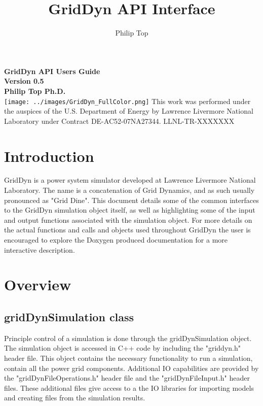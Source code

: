 \documentclass[12pt]{article} %
\title{GridDyn API Interface}
\author{Philip Top}
\date{} %
\date{\displaydate{date}}
\begin{document}
\begin{titlepage}
        \centering
        \vfill
        {\bfseries\Large
            GridDyn API Users Guide\\
            Version 0.5\\
            \vskip2cm
            Philip Top Ph.D.\\
        }
        \vfill
        \texttt{[image: ../images/GridDyn\_FullColor.png]}
        \vfill
        This work was performed under the auspices of the U.S. Department of Energy by
        Lawrence Livermore National Laboratory under Contract DE-AC52-07NA27344.
        LLNL-TR-XXXXXXX
        \vfill
\end{titlepage}

\newpage
\tableofcontents
\section{Introduction}

GridDyn is a power system simulator developed at Lawrence Livermore National Laboratory. The name is a concatenation of Grid Dynamics, and as such usually pronounced as "Grid Dine".   This document details some of the common interfaces to the GridDyn simulation object itself, as well as highlighting some of the input and output functions associated with the simulation object.  For more details on the actual functions and calls and objects used throughout GridDyn the user is encouraged to explore the Doxygen produced documentation for a more interactive description.

\section{Overview}
\subsection{gridDynSimulation class}
Principle control of a simulation is done through the  gridDynSimulation object.  The simulation object is accessed in C++ code by including the "griddyn.h" header file.  This object contains the necessary functionality to run a simulation, contain all the power grid components. Additional IO capabilities are provided by the "gridDynFileOperations.h" header file and the "gridDynFileInput.h" header files.  These additional files give access to a the IO libraries for importing models and creating files from the simulation results.
\end{document}
